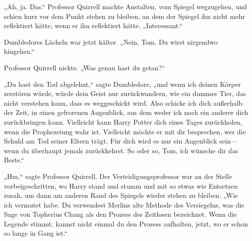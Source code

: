 „Ah, ja. Das.“
Professor Quirrell machte Anstalten, vom Spiegel wegzugehen, und schien kurz vor dem Punkt stehen zu bleiben, an dem der Spiegel ihn nicht mehr reflektiert hätte, wenn er ihn reflektiert hätte.
„Interessant.“

Dumbledores Lächeln war jetzt kälter.
„Nein, Tom. Du wirst nirgendwo hingehen.“

Professor Quirrell nickte. „Was genau hast du getan?“

„Du hast den Tod abgelehnt,“ sagte Dumbledore,
„und wenn ich deinen Körper zerstören würde, würde dein Geist nur zurückwandern, wie ein dummes Tier, das nicht verstehen kann, dass es weggeschickt wird. Also schicke ich dich außerhalb der Zeit, in einen gefrorenen Augenblick, aus dem weder ich noch ein anderer dich zurückbringen kann. Vielleicht kann Harry Potter dich eines Tages zurückholen, wenn die Prophezeiung wahr ist. Vielleicht möchte er mit dir besprechen, wer die Schuld am Tod seiner Eltern trägt. Für dich wird es nur ein Augenblick sein—wenn du überhaupt jemals zurückkehrst. So oder so, Tom, ich wünsche dir das Beste.“

„Hm,“ sagte Professor Quirrell.
Der Verteidigungsprofessor war an der Stelle vorbeigeschritten, wo Harry stand und stumm und mit so etwas wie Entsetzen zusah, um dann am anderen Rand des Spiegels wieder stehen zu bleiben.
„Wie ich vermutet habe. Du verwendest Merlins alte Methode des Versiegelns, was die Sage von Topherius Chang als den Prozess des Zeitlosen bezeichnet. Wenn die Legende stimmt, kannst nicht einmal du den Prozess aufhalten, jetzt, wo er schon so lange in Gang ist.“

